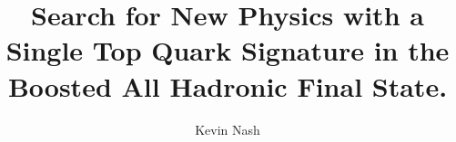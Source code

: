\documentclass[12pt,oneside,final]{thesis}
\begin{document}
\title{Search for New Physics with a Single Top Quark Signature in the Boosted All Hadronic Final State.}
\author{Kevin Nash}
\dissertation
\doctorphilosophy
\copyrightnotice













%









%







\end{document}
